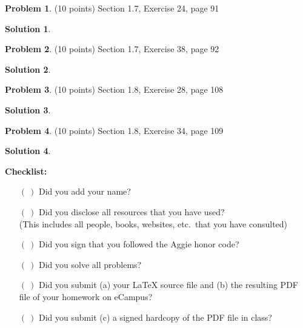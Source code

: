 \documentclass{article}
\theoremstyle{definition}
\newtheorem{problem}{Problem}
\newtheorem*{solution}{Solution}
\newcommand{\checklist}{\noindent\textbf{Checklist:}
\begin{enumerate}
\item[$(~)$] Did you add your name?
\item[$(~)$] Did you disclose all resources that you have used? \\
(This includes all people, books, websites, etc.\ that you have consulted)
\item[$(~)$] Did you sign that you followed the Aggie honor code? 
\item[$(~)$] Did you solve all problems? 
\item[$(~)$] Did you submit (a) your LaTeX source file and (b) the resulting PDF file
  of your homework on eCampus?
\item[$(~)$] Did you submit (c) a signed hardcopy of the PDF file in class? 
\end{enumerate}
}
\begin{document}
\begin{problem} (10 points)
Section 1.7, Exercise 24, page 91
\end{problem}
\begin{solution}
\end{solution}

\begin{problem} (10 points)
Section 1.7, Exercise 38, page 92
\end{problem}
\begin{solution}
\end{solution}

\begin{problem} (10 points)
Section 1.8, Exercise 28, page 108
\end{problem}
\begin{solution}
\end{solution}

\begin{problem} (10 points)
Section 1.8, Exercise 34, page 109
\end{problem}
\begin{solution}
\end{solution}

\goodbreak
\checklist
\end{document}
